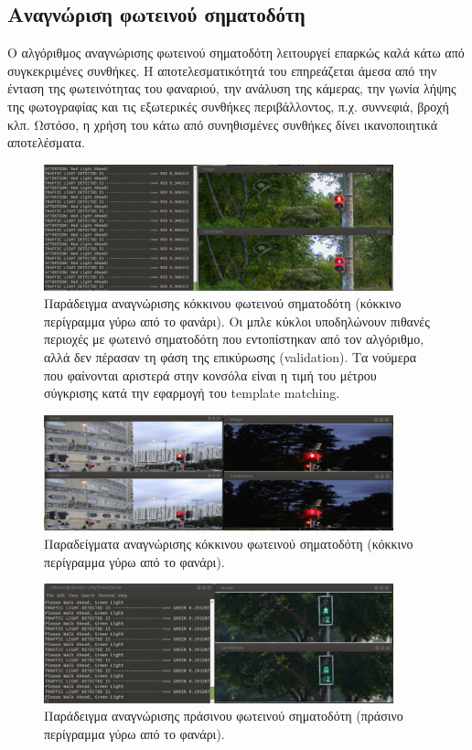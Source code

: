 \subsection{Αναγνώριση φωτεινού σηματοδότη}
Ο αλγόριθμος αναγνώρισης φωτεινού σηματοδότη λειτουργεί επαρκώς καλά κάτω από συγκεκριμένες συνθήκες. Η αποτελεσματικότητά του επηρεάζεται άμεσα από την ένταση της φωτεινότητας του φαναριού, την ανάλυση της κάμερας, την γωνία λήψης της φωτογραφίας και τις εξωτερικές συνθήκες περιβάλλοντος, π.χ. συννεφιά, βροχή κλπ. Ωστόσο, η χρήση του κάτω από συνηθισμένες συνθήκες δίνει ικανοποιητικά αποτελέσματα.
\begin{figure}[H]
    \centering
    \includegraphics[width=0.9\textwidth]{images/test_light1.png}
    \caption{Παράδειγμα αναγνώρισης κόκκινου φωτεινού σηματοδότη (κόκκινο περίγραμμα γύρω από το φανάρι). Οι μπλε κύκλοι υποδηλώνουν πιθανές περιοχές με φωτεινό σηματοδότη που εντοπίστηκαν από τον αλγόριθμο, αλλά δεν πέρασαν τη φάση της επικύρωσης (validation). Τα νούμερα που φαίνονται αριστερά στην κονσόλα είναι η τιμή του μέτρου σύγκρισης κατά την εφαρμογή του template matching.}
    \label{fig:test-light1}
\end{figure}
\begin{figure}[H]
    \centering
    \includegraphics[width=0.9\textwidth]{images/test_light2.png}
    \caption{Παραδείγματα αναγνώρισης κόκκινου φωτεινού σηματοδότη (κόκκινο περίγραμμα γύρω από το φανάρι).}
    \label{fig:test-light2}
\end{figure}
\begin{figure}[H]
    \centering
    \includegraphics[width=0.9\textwidth]{images/test_light3.png}
    \caption{Παράδειγμα αναγνώρισης πράσινου φωτεινού σηματοδότη (πράσινο περίγραμμα γύρω από το φανάρι).}
    \label{fig:test-light3}
\end{figure}
